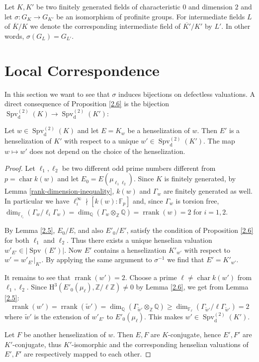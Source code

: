 Let $K,K'$ be two finitely generated fields of characteristic $0$ and dimension $2$ and let $\sigma:G_K\to G_{K'}$ be an isomorphism of profinite groups. For intermediate fields $L$ of $\overline{K}/K$ we denote the corresponding intermediate field of $\overline{K'}/K'$ by $L'$. In other words, $\sigma (G_L)=G_{L'}$.

\section{Local Correspondence}

In this section we want to see that $\sigma$ induces bijections on defectless valuations. A direct consequence of Proposition \ref{2.6} is the bijection $\operatorname{Spv}_\text{d}^{(2)}(K)\to \operatorname{Spv}_\text{d}^{(2)}(K')$:

\begin{lemma}\label{3.1}
Let $w\in\operatorname{Spv}_\text{d}^{(2)}(K)$ and let $E=K_w$ be a henselization of $w$. Then $E'$ is a henselization of $K'$ with respect to a unique $w'\in\operatorname{Spv}_\text{d}^{(2)}(K')$. The map $w\mapsto w'$ does not depend on the choice of the henselization.
\end{lemma}

\begin{proof}
Let $\ell_1,\ell_2$ be two different odd prime numbers different from $p=\operatorname{char} k(w)$ and let $E_0 = E(\mu_{\ell_1\ell_2})$. Since $K$ is finitely generated, by Lemma \ref{rank-dimension-inequality}, $k(w)$ and $\Gamma_w$ are finitely generated as well. In particular we have $\ell_i^\infty \nmid [k(w):\mathbb{F}_p]$ and, since $\Gamma_w$ is torsion free, $\dim_{\mathbb{F}_{\ell_i}}(\Gamma_w/{\ell_i}\Gamma_w) = \dim_{\mathbb{Q}}(\Gamma_w\otimes_{\mathbb{Z}}\mathbb{Q})= \operatorname{rrank}(w)=2$ for $i=1,2$.

By Lemma \ref{2.5}, $E_0/E$, and also $E'_0/E'$, satisfy the condition of Proposition \ref{2.6} for both $\ell_1$ and $\ell_2$. Thus there exists a unique henselian valuation $w'_{E'}\in|\operatorname{Spv}(E')|$. Now $E'$ contains a henselization $K'_{w'}$ with respect to $w' = w'_{E'}|_{K'}$. By applying the same argument to $\sigma^{-1}$ we find that $E' = K'_{w'}$.

It remains to see that $\operatorname{rrank}(w')=2$. Choose a prime $\ell\neq \operatorname{char} k(w')$ from $\ell_1,\ell_2$. Since $\mathrm{H}^3(E'_0(\mu_{\ell}),\mathbb{Z}/\ell\mathbb{Z})\neq 0$ by Lemma \ref{2.6}, we get from Lemma \ref{2.5}:
\[\operatorname{rrank}(w')= \operatorname{rrank}( \widetilde{w}') = \dim_{\mathbb{Q}}(\Gamma_{\widetilde{w}'}\otimes_\mathbb{Z}\mathbb{Q}) \geq \dim_{\mathbb{F}_\ell}(\Gamma_{\widetilde{w}'}/\ell\Gamma_{\widetilde{w}'})=2\]
where $\widetilde{w}'$ is the extension of $w'_{E'}$ to $E'_0(\mu_{\ell})$. This makes $w'\in\operatorname{Spv}^{(2)}_\text{d}(K')$. 

Let $F$ be another henselization of $w$. Then $E, F$ are $K$-conjugate, hence $E',F'$ are $K'$-conjugate, thus $K'$-isomorphic and the corresponding henselian valuations of $E', F'$ are respectively mapped to each other.
\end{proof}

